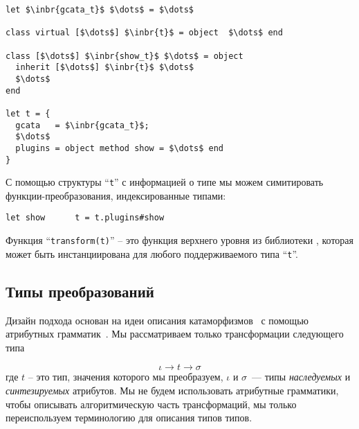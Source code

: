 \begin{lstlisting}
let $\inbr{gcata_t}$ $\dots$ = $\dots$

class virtual [$\dots$] $\inbr{t}$ = object  $\dots$ end

class [$\dots$] $\inbr{show_t}$ $\dots$ = object 
  inherit [$\dots$] $\inbr{t}$ $\dots$
  $\dots$
end

let t = {
  gcata   = $\inbr{gcata_t}$;
  $\dots$
  plugins = object method show = $\dots$ end
}
\end{lstlisting}

С помощью структуры ``\lstinline{t}'' с информацией о типе мы можем симитировать функции-преобразования, индексированные типами:

\begin{lstlisting}
let show      t = t.plugins#show
\end{lstlisting}

Функция ``\lstinline{transform(t)}'' -- это функция верхнего уровня из библиотеки \GT{}, которая может быть инстанциирована для любого поддерживаемого типа  ``\lstinline{t}''. 


\subsection{Типы преобразований}

Дизайн подхода основан на идеи описания катаморфизмов~\cite{Bananas} с помощью атрибутных 
грамматик~\cite{AGKnuth,AGSwierstra,ObjectAlgebrasAttribute}.
Мы рассматриваем только трансформации следующего типа

\[
\iota \to t \to \sigma
\]
где $t$ -- это тип, значения которого мы преобразуем, $\iota$ и $\sigma$~--- типы \emph{наследуемых} и \emph{синтезируемых} атрибутов. 
Мы не будем использовать атрибутные грамматики, чтобы описывать алгоритмическую часть трансформаций, мы только переиспользуем терминологию для описания типов типов. 

